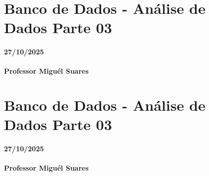 \documentclass[
]{book}
\begin{document}
\chapter{Banco de Dados - Análise de Dados Parte 03}\label{banco-de-dados---anuxe1lise-de-dados-parte-03}

\subsubsection*{27/10/2025}\label{section-19}

\subsubsection*{Professor Miguél Suares}\label{professor-miguuxe9l-suares-19}

\chapter{Banco de Dados - Análise de Dados Parte 03}\label{banco-de-dados---anuxe1lise-de-dados-parte-03-1}

\subsubsection*{27/10/2025}\label{section-20}

\subsubsection*{Professor Miguél Suares}\label{professor-miguuxe9l-suares-20}

  
\end{document}
